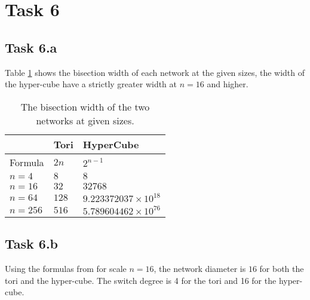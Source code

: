 \section{Task 6}

\subsection{Task 6.a}

Table \ref{tab:t6a} shows the bisection width of each network at the given
sizes, the width of the hyper-cube have a strictly greater width at $n=16$ and
higher.

\begin{table}[]
\centering
\begin{tabular}{l|ll}
        & Tori  & HyperCube                   \\ \hline
Formula & $2n$  & $2^{n-1}$                   \\
$n=4$   & $8$   & $8$                         \\
$n=16$  & $32$  & $32768$                     \\
$n=64$  & $128$ & $9.223372037\times 10^{18}$ \\
$n=256$ & $516$ & $5.789604462\times 10^{76}$
\end{tabular}
\caption{The bisection width of the two networks at given sizes.}
\label{tab:t6a}
\end{table}

\subsection{Task 6.b}


Using the formulas from \cite[slide 38]{l7Interconnect} for scale $n=16$, the
network diameter is $16$ for both the tori and the hyper-cube. The switch degree
is 4 for the tori and 16 for the hyper-cube.

